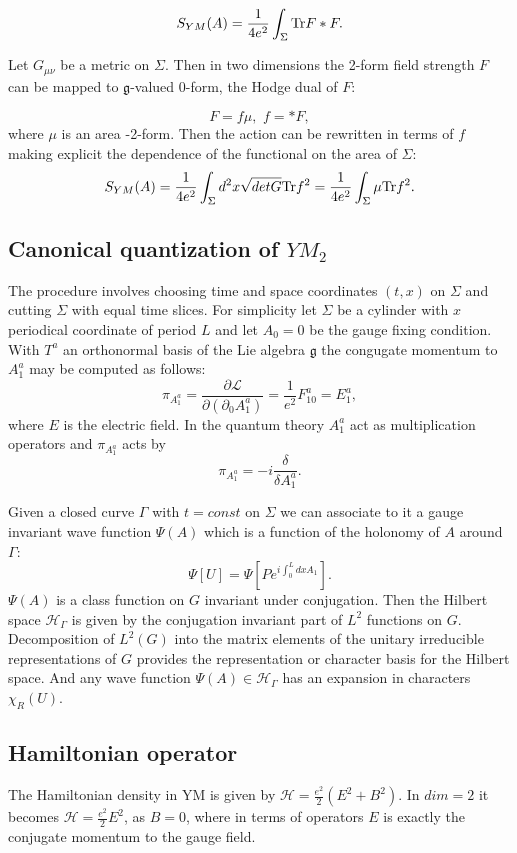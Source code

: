 \documentclass[11pt]{report}
\theoremstyle{plain}
\theoremstyle{definition}
\theoremstyle{remark}
\theoremstyle{remark}
\numberwithin{equation}{section}
\begin{document}
$$ S_{YM}(A)  = \frac{1}{4 e^2} \int_{\Sigma} {\rm Tr} F \ast F.$$

Let $G_{\mu \nu}$ be a metric on $\Sigma$. Then in two dimensions the 2-form field strength $F$ can be mapped to $\mathfrak{g}$-valued 0-form, the Hodge dual of $F$:

$$ F = f\mu, \, \,  f = \ast F,$$
where  $\mu$ is an area -2-form.
Then the action can be rewritten in terms of $f$ making explicit the dependence of the functional on the area of $\Sigma$:
$$ S_{YM}(A)  = \frac{1}{4 e ^2} \int_{\Sigma} d^2 x \sqrt{det G} {\rm Tr} f^2 =  \frac{1}{4 e ^2} \int_{\Sigma} \mu {\rm Tr} f^2.$$


\subsection{Canonical quantization of $YM_2$}  
The procedure involves choosing time and space coordinates $(t,x)$ on $\Sigma$ and cutting $\Sigma$ with equal time slices. For simplicity let $\Sigma$ be a cylinder with $x$ periodical coordinate of period $L$ and let $A_0 = 0$ be the gauge fixing condition. With $T^a$ an orthonormal basis of the Lie algebra $\mathfrak{g}$ the congugate momentum to $A^a_1$ may be computed as follows:
$$ \pi_{A^a_1} = \frac{\partial \mathcal{L}}{\partial (\partial_0 A^a_1)} = \frac{1}{e^2}F^a_{10} = E^a_1, $$
where $E$ is the electric field. In the quantum theory $A^a_1$ act as multiplication operators and $\pi_{A^a_1}$ acts by 
$$\pi_{A^a_1} = -i\frac{\delta}{\delta A^a_1}.$$

Given a closed curve $\Gamma$ with $t=const$ on $\Sigma$ we can associate to it a gauge invariant wave function $\Psi (A)$ which is a function of the holonomy of $A$ around $\Gamma$:
$$ \Psi[U] = \Psi [P e^{i\int_0^L dx A_1} ].$$
$\Psi (A)$ is a class function on $G$ invariant under conjugation.
Then the Hilbert space $\mathcal{H}_{\Gamma}$ is given by the conjugation invariant part of $L^2$ functions on $G$. Decomposition of $L^2(G)$ into the matrix elements of the unitary irreducible representations of $G$ provides the representation or character basis for the Hilbert space. And any wave function $\Psi (A) \in \mathcal{H}_{\Gamma}$ has an expansion in characters $\chi_R(U)$.

\subsection{Hamiltonian operator}

The Hamiltonian density in YM is given by $\mathcal{H}=\frac{e^2}{2}(E^2 + B^2)$. In $dim=2$ it becomes $\mathcal{H}=\frac{e^2}{2} E^2$, as $B=0$, where in terms of operators $E$ is exactly the conjugate momentum to the gauge field. 
\end{document}
